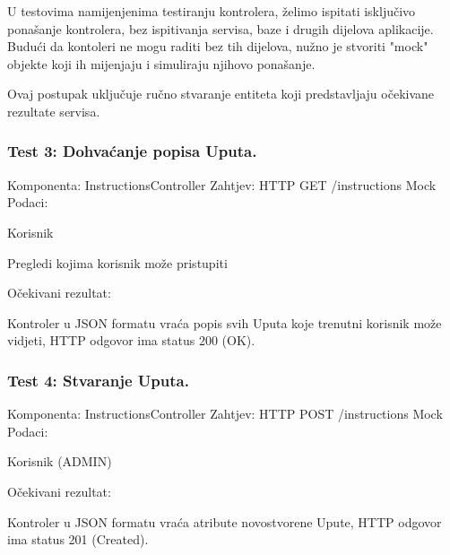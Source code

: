 			U testovima namijenjenima testiranju kontrolera, želimo ispitati isključivo ponašanje kontrolera, bez ispitivanja servisa, baze i drugih dijelova aplikacije.
			Budući da kontoleri ne mogu raditi bez tih dijelova, nužno je stvoriti "mock" objekte koji ih mijenjaju i simuliraju njihovo ponašanje.

			Ovaj postupak uključuje ručno stvaranje entiteta koji predstavljaju očekivane rezultate servisa.

			\subsubsection*{Test 3: Dohvaćanje popisa Uputa.}
			Komponenta: InstructionsController \newline
			Zahtjev: HTTP GET /instructions \newline
			Mock Podaci:
			\begin{packed_item}
				\item Korisnik
				\item Pregledi kojima korisnik može pristupiti
			\end{packed_item}
			Očekivani rezultat:
			\begin{packed_item}
				\item Kontroler u JSON formatu vraća popis svih Uputa koje trenutni korisnik može vidjeti, HTTP odgovor ima status 200 (OK).
			\end{packed_item}
			
			
			\subsubsection*{Test 4: Stvaranje Uputa.}
			Komponenta: InstructionsController \newline
			Zahtjev: HTTP POST /instructions \newline
			Mock Podaci:
			\begin{packed_item}
				\item Korisnik (ADMIN)
			\end{packed_item}
			Očekivani rezultat:
			\begin{packed_item}
				\item Kontroler u JSON formatu vraća atribute novostvorene Upute, HTTP odgovor ima status 201 (Created).
			\end{packed_item}
			

